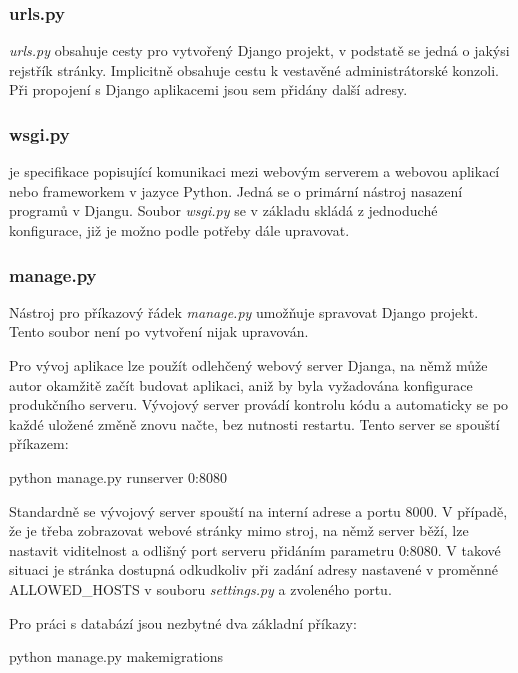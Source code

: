 \subsubsection{urls.py}
\textit{urls.py} obsahuje  cesty pro vytvořený Django projekt,
v podstatě se jedná o jakýsi rejstřík stránky. Implicitně obsahuje
cestu k vestavěné administrátorské konzoli. Při propojení s Django
aplikacemi jsou sem přidány další  adresy.

\subsubsection{wsgi.py}
 je specifikace popisující komunikaci mezi webovým serverem a
webovou aplikací nebo frameworkem v jazyce Python. Jedná se o primární
nástroj nasazení programů v Djangu. Soubor \textit{wsgi.py} se v
základu skládá z jednoduché  konfigurace, již je možno podle
potřeby dále upravovat.

\subsubsection{manage.py}
Nástroj pro příkazový řádek \textit{manage.py} umožňuje spravovat
Django projekt. Tento soubor není po vytvoření nijak upravován.

Pro vývoj aplikace lze použít odlehčený webový server Djanga, na němž
může autor okamžitě začít budovat aplikaci, aniž by byla vyžadována
konfigurace produkčního serveru. Vývojový server provádí kontrolu kódu
a automaticky se po každé uložené změně znovu načte, bez nutnosti
restartu. Tento server se spouští příkazem:

\begin{center}
\textsf{python manage.py runserver 0:8080}
\end{center}

Standardně se vývojový server spouští na interní  adrese a
portu 8000. V případě, že je třeba zobrazovat webové stránky mimo
stroj, na němž server běží, lze nastavit viditelnost a odlišný port
serveru přidáním parametru \textsf{0:8080}. V takové situaci je
stránka dostupná odkudkoliv při zadání adresy nastavené v proměnné
\textsf{ALLOWED\_HOSTS} v souboru \textit{settings.py} a zvoleného
portu.

Pro práci s databází jsou nezbytné dva základní příkazy:

\begin{center}
\textsf{python manage.py makemigrations}
\end{center}

